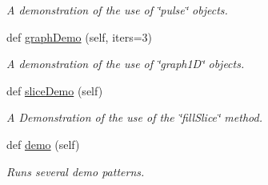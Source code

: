 \begin{DoxyCompactItemize}
\begin{DoxyCompactList}\small\item\em A demonstration of the use of \char`\"{}pulse\char`\"{} objects. \end{DoxyCompactList}\item 
def \hyperlink{classglowbit_1_1stick_a7f45fb8bf324841b710a215b1b2e3a1c}{graph\+Demo} (self, iters=3)
\begin{DoxyCompactList}\small\item\em A demonstration of the use of \char`\"{}graph1\+D\char`\"{} objects. \end{DoxyCompactList}\item 
def \hyperlink{classglowbit_1_1stick_a26eedb25d40d67d1e2ca786a7b8eb8b0}{slice\+Demo} (self)
\begin{DoxyCompactList}\small\item\em A Demonstration of the use of the \char`\"{}fill\+Slice\char`\"{} method. \end{DoxyCompactList}\item 
\mbox{\label{classglowbit_1_1stick_a6630193c4696faead410a15c7e98e9c8}} 
def \hyperlink{classglowbit_1_1stick_a6630193c4696faead410a15c7e98e9c8}{demo} (self)
\begin{DoxyCompactList}\small\item\em Runs several demo patterns. \end{DoxyCompactList}\end{DoxyCompactItemize}
